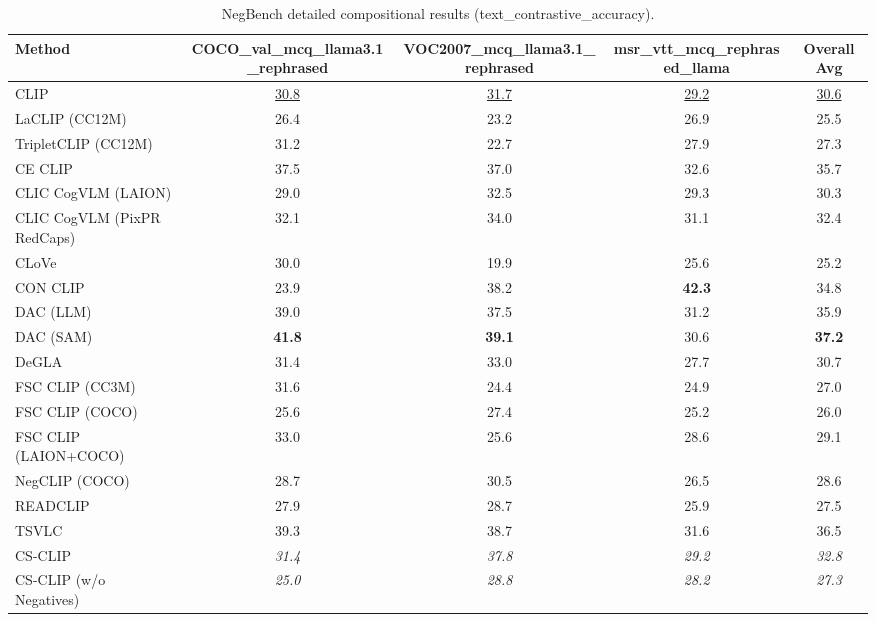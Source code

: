 \begin{table}[t]
  \centering
  \scriptsize
  \caption{NegBench detailed compositional results (text_contrastive_accuracy).}
  \label{tab:NegBench_detailed}
  \begin{adjustbox}{max width=\textwidth}
  \setlength{\tabcolsep}{2pt}
  \begin{tabular}{p{5cm}c|c|c|c}
    \toprule
    Method & COCO\_val\_mcq\_llama3.1\_rephrased & VOC2007\_mcq\_llama3.1\_rephrased & msr\_vtt\_mcq\_rephrased\_llama & Overall Avg \\
    \midrule
    CLIP & \underline{30.8} & \underline{31.7} & \underline{29.2} & \underline{30.6} \\
    \midrule
    LaCLIP (CC12M) & 26.4 & 23.2 & 26.9 & 25.5 \\
    TripletCLIP (CC12M) & 31.2 & 22.7 & 27.9 & 27.3 \\
    \midrule
    CE CLIP & 37.5 & 37.0 & 32.6 & 35.7 \\
    CLIC CogVLM (LAION) & 29.0 & 32.5 & 29.3 & 30.3 \\
    CLIC CogVLM (PixPR RedCaps) & 32.1 & 34.0 & 31.1 & 32.4 \\
    CLoVe & 30.0 & 19.9 & 25.6 & 25.2 \\
    CON CLIP & 23.9 & 38.2 & \textbf{42.3} & 34.8 \\
    DAC (LLM) & 39.0 & 37.5 & 31.2 & 35.9 \\
    DAC (SAM) & \textbf{41.8} & \textbf{39.1} & 30.6 & \textbf{37.2} \\
    DeGLA & 31.4 & 33.0 & 27.7 & 30.7 \\
    FSC CLIP (CC3M) & 31.6 & 24.4 & 24.9 & 27.0 \\
    FSC CLIP (COCO) & 25.6 & 27.4 & 25.2 & 26.0 \\
    FSC CLIP (LAION+COCO) & 33.0 & 25.6 & 28.6 & 29.1 \\
    NegCLIP (COCO) & 28.7 & 30.5 & 26.5 & 28.6 \\
    READCLIP & 27.9 & 28.7 & 25.9 & 27.5 \\
    TSVLC & 39.3 & 38.7 & 31.6 & 36.5 \\
    \midrule
    CS-CLIP & \emph{31.4} & \emph{37.8} & \emph{29.2} & \emph{32.8} \\
    CS-CLIP (w/o Negatives) & \emph{25.0} & \emph{28.8} & \emph{28.2} & \emph{27.3} \\
    \bottomrule
  \end{tabular}
  \end{adjustbox}
\end{table}
